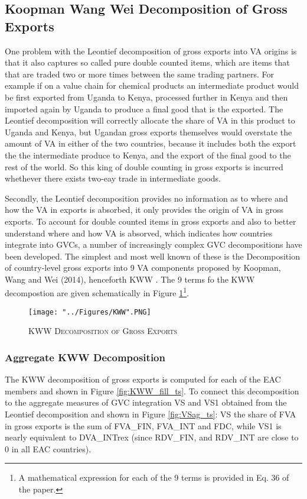 \documentclass[a4paper]{article}
\begin{document}
\subsection{Koopman Wang Wei Decomposition of Gross Exports}
One problem with the Leontief decomposition of gross exports into VA origins is that it also captures so called pure double counted items, which are items that that are traded two or more times between the same trading partners. For example if on a value chain for chemical products an intermediate product would be first exported from Uganda to Kenya, processed further in Kenya and then imported again by Uganda to produce a final good that is the exported. The Leontief decomposition will correctly allocate the share of VA in this product to Uganda and Kenya, but Ugandan gross exports themselves would overstate the amount of VA in either of the two countries, because it includes both the export the the intermediate produce to Kenya, and the export of the final good to the rest of the world. So this king of double counting in gross exports is incurred whethever there exists two-eay trade in intermediate goods. \newline

Secondly, the Leontief decomposition provides no information as to where and how the VA in exports is absorbed, it only provides the origin of VA in gross exports. To account for double counted items in gross exports and also to better understand where and how VA is absorved, which indicates how countries integrate into GVCs, a number of increasingly complex GVC decompositions have been developed. The simplest and most well known of these is the Decomposition of country-level gross exports into 9 VA components proposed by Koopman, Wang and Wei (2014), henceforth KWW \citep{koopman2014tracing}. The 9 terms fo the KWW decompostion are given schematically in Figure \ref{fig:KWW}\footnote{A mathematical expression for each of the 9 terms is provided in Eq. 36 of the \citet{koopman2014tracing} paper.}.

\begin{figure}[h!]
\centering
\caption{\label{fig:KWW}\textsc{KWW Decomposition of Gross Exports}}
\texttt{[image: "../Figures/KWW".PNG]} %
\end{figure}
\FloatBarrier

\subsubsection{Aggregate KWW Decomposition}
The KWW decomposition of gross exports is computed for each of the EAC members and shown in Figure \ref{fig:KWW_fill_ts}. To connect this decomposition to the aggregate measures of GVC integration VS and VS1 obtained from the Leontief decomposition and shown in Figure \ref{fig:VSag_ts}: VS the share of FVA in gross exports is the sum of FVA\_FIN, FVA\_INT  and FDC, while VS1 is nearly equivalent to DVA\_INTrex (since RDV\_FIN, and RDV\_INT are close to 0 in all EAC countries).  
\end{document}
